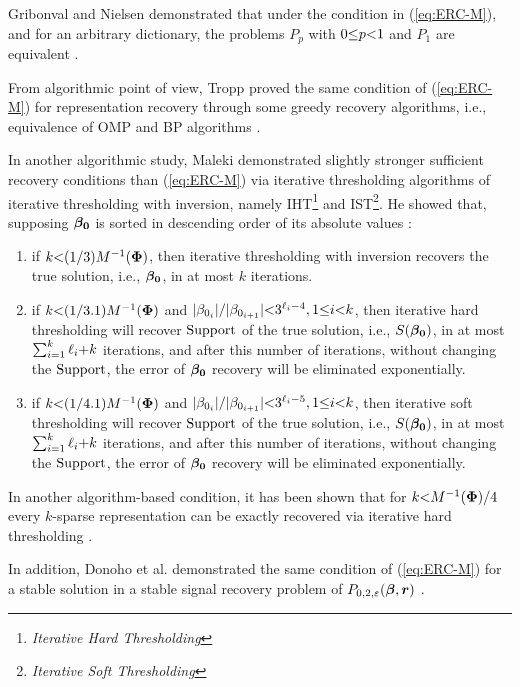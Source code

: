 Gribonval and Nielsen demonstrated that under the condition in (\ref{eq:ERC-M}), and for an arbitrary dictionary, the problems $P_p$ with $0 {\leq} p {<} 1$ and $P_1$ are equivalent \cite{Gribonval2007}. 

From algorithmic point of view, Tropp proved the same condition of (\ref{eq:ERC-M}) for representation recovery through some greedy recovery algorithms, i.e., equivalence of OMP and BP algorithms \cite{Tropp2004}.

In another algorithmic study, Maleki demonstrated slightly stronger sufficient recovery conditions than (\ref{eq:ERC-M}) via iterative thresholding algorithms of iterative thresholding with inversion, namely IHT\footnote{\emph{Iterative Hard Thresholding}} and IST\footnote{\emph{Iterative Soft Thresholding}}.
He showed that, supposing $\boldsymbol{\beta_0}$ is sorted in descending order of its
absolute values \cite{Maleki2009}:
\begin{enumerate}
\item if $k {<} (1/3)M^{-1}(\boldsymbol{\Phi})$, then iterative thresholding with inversion recovers the true solution, i.e., $\boldsymbol{\beta_0}$, in at most $k$ iterations.
\item if $k {<} (1/3.1)M^{-1}(\boldsymbol{\Phi})$ and $\vert \beta_{0_i} \vert/ \vert\beta_{0_{i {+} 1}}\vert {<} 3^{\ell_i {-} 4}, 1 {\leq} i {<} k$, then iterative hard thresholding will recover $\mathrm{Support}$ of the true solution, i.e., $S(\boldsymbol{\beta_0})$, in at most $\sum_{i {=} 1}^k \ell_i {+} k$ iterations, and after this number of iterations, without changing the $\mathrm{Support}$, the error of $\boldsymbol{\beta_0}$ recovery will be eliminated exponentially.
\item if $k {<} (1/4.1)M^{-1}(\boldsymbol{\Phi})$ and $\vert \beta_{0_i} \vert/ \vert\beta_{0_{i {+} 1}} \vert {<} 3^{\ell_i {-} 5}, 1 {\leq} i {<} k$, then iterative soft thresholding will recover $\mathrm{Support}$ of the true solution, i.e., $S(\boldsymbol{\beta_0})$, in at most $\sum_{i {=} 1}^k \ell_i {+} k$ iterations, and after this number of iterations, without changing the $\mathrm{Support}$, the error of $\boldsymbol{\beta_0}$ recovery will be eliminated exponentially.
\end{enumerate}
In another algorithm-based condition, it has been shown that for $k {<} M^{-1}(\boldsymbol{\Phi})/4$ every $k$-sparse representation can be exactly recovered via iterative hard thresholding \cite{Foucart2013}.

In addition, Donoho et al. demonstrated the same condition of (\ref{eq:ERC-M}) for a stable solution in a stable signal recovery problem of $P_{0,2,\varepsilon}(\boldsymbol{\beta}, \boldsymbol{r})$ \cite{Donoho2006a}.
\iffalse
In an attempt to improve the recovery conditions while using the same formula in (\ref{eq:ERC-M}), it is assumed that if we are given infinite number of USLE $\{y_i\}_{i=1}^\infty \seq \{\myPhi \beta_{0_i} \}_{i=1}^\infty $, generated with the same probabilistic law, then the MCC of the ensemble, denoted by $M_{Ensemble}$, would be $M^O(\myPhi)$ for $O \seq \{2,3,\cdots\}$, where, $O$ is the order of the moment used in the statistic analysis \cite{Donoho2003a}.
\fi